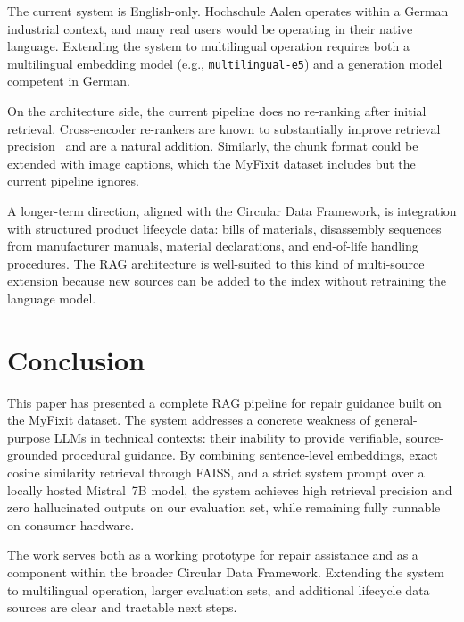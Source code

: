 \documentclass[journal,onecolumn]{IEEEtran}
\begin{document}
The current system is English-only. Hochschule Aalen operates within a
German industrial context, and many real users would be operating in their
native language. Extending the system to multilingual operation requires
both a multilingual embedding model (e.g., \texttt{multilingual-e5}) and
a generation model competent in German.

On the architecture side, the current pipeline does no re-ranking after
initial retrieval. Cross-encoder re-rankers are known to substantially
improve retrieval precision~\cite{karpukhin2020dpr} and are a natural
addition. Similarly, the chunk format could be extended with image
captions, which the MyFixit dataset includes but the current pipeline
ignores.

A longer-term direction, aligned with the Circular Data Framework, is
integration with structured product lifecycle data: bills of materials,
disassembly sequences from manufacturer manuals, material declarations,
and end-of-life handling procedures. The RAG architecture is well-suited
to this kind of multi-source extension because new sources can be added
to the index without retraining the language model.

\section{Conclusion}
\label{sec:conclusion}

This paper has presented a complete RAG pipeline for repair guidance built
on the MyFixit dataset. The system addresses a concrete weakness of
general-purpose LLMs in technical contexts: their inability to provide
verifiable, source-grounded procedural guidance. By combining sentence-level
embeddings, exact cosine similarity retrieval through FAISS, and a strict
system prompt over a locally hosted Mistral~7B model, the system achieves
high retrieval precision and zero hallucinated outputs on our evaluation
set, while remaining fully runnable on consumer hardware.

The work serves both as a working prototype for repair assistance and as a
component within the broader Circular Data Framework. Extending the system
to multilingual operation, larger evaluation sets, and additional lifecycle
data sources are clear and tractable next steps.



\end{document}
